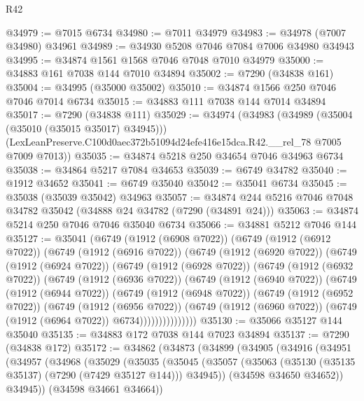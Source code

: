 \begin{lexlean}{R42}
\begin{coremodule}
{@34979 := @7015 @6734
@34980 := @7011 @34979
@34983 := @34978 (@7007 @34980) @34961
@34989 := @34930 @5208 @7046 @7084 @7006 @34980 @34943
@34995 := @34874 @1561 @1568 @7046 @7048 @7010 @34979
@35000 := @34883 @161 @7038 @144 @7010 @34894
@35002 := @7290 (@34838 @161)
@35004 := @34995 (@35000 @35002)
@35010 := @34874 @1566 @250 @7046 @7046 @7014 @6734
@35015 := @34883 @111 @7038 @144 @7014 @34894
@35017 := @7290 (@34838 @111)
@35029 := @34974
    (@34983
      (@34989 (@35004 (@35010 (@35015 @35017) @34945)))
      (LexLeanPreserve.C100d0aec372b51094d24efe416e15dca.R42.__rel_78 @7005 @7009 @7013))
@35035 := @34874 @5218 @250 @34654 @7046 @34963 @6734
@35038 := @34864 @5217 @7084 @34653
@35039 := @6749 @34782
@35040 := @1912 @34652
@35041 := @6749 @35040
@35042 := @35041 @6734
@35045 := @35038 (@35039 @35042) @34963
@35057 := @34874 @244 @5216 @7046 @7048 @34782 @35042 (@34888 @24 @34782 (@7290 (@34891 @24)))
@35063 := @34874 @5214 @250 @7046 @7046 @35040 @6734
@35066 := @34881 @5212 @7046 @144
@35127 := @35041
    (@6749
      (@1912 (@6908 @7022))
      (@6749
        (@1912 (@6912 @7022))
        (@6749
          (@1912 (@6916 @7022))
          (@6749
            (@1912 (@6920 @7022))
            (@6749
              (@1912 (@6924 @7022))
              (@6749
                (@1912 (@6928 @7022))
                (@6749
                  (@1912 (@6932 @7022))
                  (@6749
                    (@1912 (@6936 @7022))
                    (@6749
                      (@1912 (@6940 @7022))
                      (@6749
                        (@1912 (@6944 @7022))
                        (@6749
                          (@1912 (@6948 @7022))
                          (@6749
                            (@1912 (@6952 @7022))
                            (@6749
                              (@1912 (@6956 @7022))
                              (@6749
                                (@1912 (@6960 @7022))
                                (@6749 (@1912 (@6964 @7022)) @6734)))))))))))))))
@35130 := @35066 @35127 @144 @35040
@35135 := @34883 @172 @7038 @144 @7023 @34894
@35137 := @7290 (@34838 @172)
@35172 := @34862
    (@34873
      (@34899
        (@34905
          (@34916
            (@34951
              (@34957
                (@34968
                  (@35029
                    (@35035
                      (@35045
                        (@35057
                          (@35063 (@35130 (@35135 @35137) (@7290 (@7429 @35127 @144))) @34945))
                        (@34598 @34650 @34652))
                      @34945))
                  (@34598 @34661 @34664))
}
\end{coremodule}
\end{lexlean}
